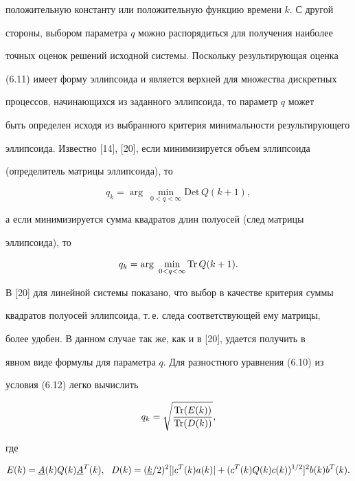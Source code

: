 положительную константу или положительную функцию времени $k$. С другой


стороны, выбором параметра $q$ можно распорядиться для получения наиболее


точных оценок решений исходной системы. Поскольку результирующая оценка


(6.11) имеет форму эллипсоида и является верхней для множества дискретных


процессов, начинающихся из заданного эллипсоида, то параметр $q$ может


быть определен исходя из выбранного критерия минимальности результирующего


эллипсоида. Известно [14], [20], если минимизируется объем эллипсоида


(определитель матрицы эллипсоида), то


$$


q_k=\arg\ \min_{0<q<\infty}\mathrm{Det}\,Q(k+1),


$$


а если минимизируется сумма квадратов длин полуосей (след матрицы


эллипсоида), то


\begin{equation}


q_k=\arg\ \min_{0<q<\infty}\Tr Q(k+1).


\end{equation}





В [20] для линейной системы показано, что выбор в качестве критерия суммы


квадратов полуосей эллипсоида, т.\,е. следа соответствующей ему матрицы,


более удобен. В данном случае так же, как и в [20], удается получить в


явном виде формулы для параметра $q$. Для разностного уравнения (6.10) из


условия (6.12) легко вычислить


\begin{equation}


q_k=\sqrt{\frac{\Tr(E(k))}{\Tr(D(k))}},


\end{equation}


где


\begin{equation}


E(k)=\uA(k)Q(k)\uA^T(k),\ \ D(k)=(\uk/2)^2


[|c^T(k)a(k)|+(c^T(k)Q(k)c(k))^{1/2}]^2b(k)b^T(k).


\end{equation}





